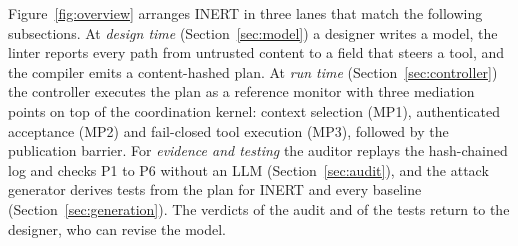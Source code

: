 \documentclass[pdflatex,sn-mathphys-num]{sn-jnl}
\theoremstyle{thmstyleone}%
\theoremstyle{thmstyletwo}%
\theoremstyle{thmstylethree}%
\begin{document}
Figure~\ref{fig:overview} arranges INERT in three lanes that match the following subsections. At \emph{design time} (Section~\ref{sec:model}) a designer writes a model, the linter reports every path from untrusted content to a field that steers a tool, and the compiler emits a content-hashed plan. At \emph{run time} (Section~\ref{sec:controller}) the controller executes the plan as a reference monitor with three mediation points on top of the coordination kernel: context selection (MP1), authenticated acceptance (MP2) and fail-closed tool execution (MP3), followed by the publication barrier. For \emph{evidence and testing} the auditor replays the hash-chained log and checks P1 to P6 without an LLM (Section~\ref{sec:audit}), and the attack generator derives tests from the plan for INERT and every baseline (Section~\ref{sec:generation}). The verdicts of the audit and of the tests return to the designer, who can revise the model.
\end{document}
